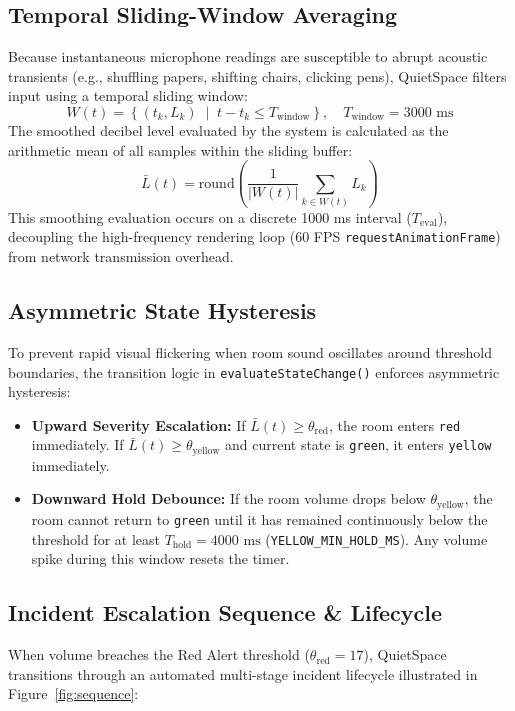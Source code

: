 \documentclass[11pt,a4paper]{article}
\begin{document}
\subsection{Temporal Sliding-Window Averaging}
Because instantaneous microphone readings are susceptible to abrupt acoustic transients (e.g., shuffling papers, shifting chairs, clicking pens), QuietSpace filters input using a temporal sliding window:
\begin{equation}
    W(t) = \left\{ (t_k, L_k) \;\middle|\; t - t_k \le T_{\text{window}} \right\}, \quad T_{\text{window}} = 3000\text{ ms}
\end{equation}
The smoothed decibel level evaluated by the system is calculated as the arithmetic mean of all samples within the sliding buffer:
\begin{equation}
    \bar{L}(t) = \text{round}\left( \frac{1}{|W(t)|} \sum_{k \in W(t)} L_k \right)
\end{equation}
This smoothing evaluation occurs on a discrete 1000 ms interval ($T_{\text{eval}}$), decoupling the high-frequency rendering loop (60 FPS \texttt{requestAnimationFrame}) from network transmission overhead.

\subsection{Asymmetric State Hysteresis}
To prevent rapid visual flickering when room sound oscillates around threshold boundaries, the transition logic in \texttt{evaluateStateChange()} enforces asymmetric hysteresis:
\begin{itemize}[leftmargin=*]
    \item \textbf{Upward Severity Escalation:} If $\bar{L}(t) \ge \theta_{\text{red}}$, the room enters \texttt{red} immediately. If $\bar{L}(t) \ge \theta_{\text{yellow}}$ and current state is \texttt{green}, it enters \texttt{yellow} immediately.
    \item \textbf{Downward Hold Debounce:} If the room volume drops below $\theta_{\text{yellow}}$, the room cannot return to \texttt{green} until it has remained continuously below the threshold for at least $T_{\text{hold}} = 4000\text{ ms}$ (\texttt{YELLOW\_MIN\_HOLD\_MS}). Any volume spike during this window resets the timer.
\end{itemize}

\subsection{Incident Escalation Sequence \& Lifecycle}
When volume breaches the Red Alert threshold ($\theta_{\text{red}} = 17$), QuietSpace transitions through an automated multi-stage incident lifecycle illustrated in Figure~\ref{fig:sequence}:
\end{document}
